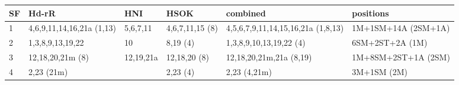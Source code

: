 \begin{tabular}{p{0.6cm}p{3.4cm}p{1.5cm}p{2cm}p{4.5cm}p{3.7cm}}
  \hline
  SF & Hd-rR & HNI & HSOK & combined & positions \\ \hline
  1 & 4,6,9,11,14,16,21a (1,13) & 5,6,7,11  & 4,6,7,11,15 (8) & 4,5,6,7,9,11,14,15,16,21a (1,8,13) & 1M+1SM+14A (2SM+1A) \\
  2 & 1,3,8,9,13,19,22          & 10        & 8,19 (4)        & 1,3,8,9,10,13,19,22 (4)            & 6SM+2ST+2A (1M) \\
  3 & 12,18,20,21m (8)          & 12,19,21a & 12,18,20 (8)    & 12,18,20,21m,21a (8,19)            & 1M+8SM+2ST+1A (2SM) \\
  4 & 2,23 (21m)                &           & 2,23 (4)        & 2,23 (4,21m)                       & 3M+1SM (2M) \\
  \hline
\end{tabular}
